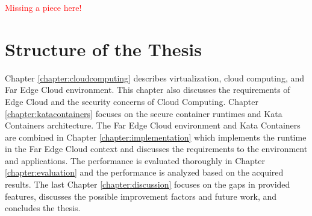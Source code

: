 \textcolor{red}{Missing a piece here!}

\section{Structure of the Thesis}
\label{section:intro_structure}

Chapter \ref{chapter:cloudcomputing} describes virtualization, cloud computing, and Far Edge Cloud environment. This chapter also discusses the requirements of Edge Cloud and the security concerns of Cloud Computing. Chapter \ref{chapter:katacontainers} focuses on the secure container runtimes and Kata Containers architecture. The Far Edge Cloud environment and Kata Containers are combined in Chapter \ref{chapter:implementation} which implements the runtime in the Far Edge Cloud context and discusses the requirements to the environment and applications. The performance is evaluated thoroughly in Chapter \ref{chapter:evaluation} and the performance is analyzed based on the acquired results. The last Chapter \ref{chapter:discussion} focuses on the gaps in provided features, discusses the possible improvement factors and future work, and concludes the thesis.